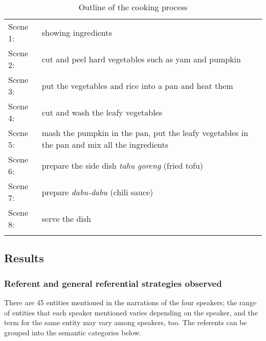 \documentclass[output=paper
,modfonts
,nonflat]{langsci/langscibook}
\begin{document}
\begin{table}[p]
\caption{Outline of the cooking process\label{tab:cookingprocess3}}
\begin{tabularx}{.8\textwidth}{lX}
\lsptoprule
	Scene 1: & showing ingredients\\	
	Scene 2: & cut and peel hard vegetables such as yam and pumpkin\\
	Scene 3: & put the vegetables and rice into a pan and heat them\\
	Scene 4: & cut and wash the leafy vegetables\\
	Scene 5: & mash the pumpkin in the pan, put the leafy vegetables in the pan and mix all the ingredients\\	
	Scene 6: &prepare the side dish \textit{tahu goreng} (fried tofu)\\	
	Scene 7: & prepare \textit{dabu-dabu} (chili sauce)\\
	Scene 8: & serve the dish\\
    \lspbottomrule
\end{tabularx}
\end{table}

\subsection{\label{s4.2}Results}

\subsubsection{\label{s4.2.1}Referent and general referential strategies observed}

There are 45 entities mentioned in the narrations of the four speakers; the range of entities that each speaker mentioned varies depending on the speaker, and the term for the same entity may vary among speakers, too. The referents can be grouped into the semantic categories below.
\end{document}
